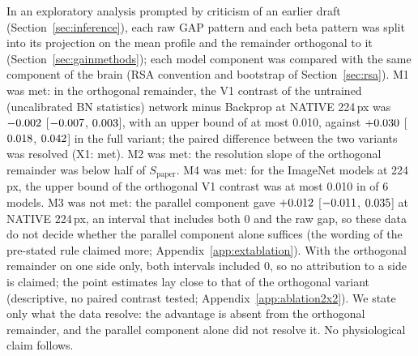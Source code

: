In an exploratory analysis prompted by criticism of an earlier draft (Section~\ref{sec:inference}),
each raw GAP pattern and each beta pattern was split into its projection on the mean profile and
the remainder orthogonal to it (Section~\ref{sec:gainmethods}); each model component was compared
with the same component of the brain (RSA convention and bootstrap of
Section~\ref{sec:rsa}). M1 was met: in the orthogonal
remainder, the V1 contrast of the untrained (uncalibrated BN statistics) network minus Backprop at
NATIVE 224\,px was $-0.002$ [$-0.007$,
$0.003$], with an upper bound of at most 0.010, against
$+0.030$ [$0.018$, $0.042$] in
the full variant; the paired difference between the two variants was resolved (X1: met). M2 was
met: the resolution slope of the orthogonal remainder was below half of $S_{\mathrm{paper}}$. M4
was met: for the ImageNet models at 224\,px, the upper bound of the orthogonal V1 contrast was at
most 0.010 in \MpMFourModels{} of 6 models. M3 was not met: the parallel component gave
$+0.012$ [$-0.011$, $0.035$] at
NATIVE 224\,px, an interval that includes both 0 and the raw gap, so these data do not decide
whether the parallel component alone suffices (the wording of the pre-stated rule claimed more;
Appendix~\ref{app:extablation}). With the orthogonal remainder on one side only, both intervals
included 0, so no attribution to a side is claimed; the point estimates lay close to that of the
orthogonal variant (descriptive, no paired contrast tested; Appendix~\ref{app:ablation2x2}). We
state only what the data resolve: the advantage is absent from the orthogonal remainder, and the
parallel component alone did not resolve it. No physiological claim follows.
